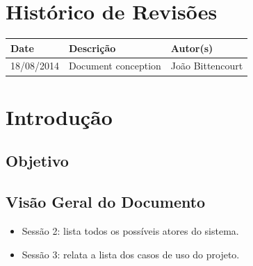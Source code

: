 \documentclass{article}
\begin{document}

\capa
\newpage

\section*{\center Histórico de Revisões}
  \vspace*{1cm}
  \begin{table}[ht]
    \centering
    \begin{tabular}[pos]{|m{2cm} | m{7.2cm} | m{3.8cm}|} 
      \hline
      \cellcolor[gray]{0.9}
      \textbf{Date} & \cellcolor[gray]{0.9}\textbf{Descrição} & \cellcolor[gray]{0.9}\textbf{Autor(s)}\\ \hline
      \hline
      \small 18/08/2014 & \small Document conception & \small João Bittencourt \\ \hline      
    \end{tabular}
  \end{table}

\newpage

\tableofcontents
\newpage

\section{Introdução}

  \subsection{Objetivo}
  
  \subsection{Visão Geral do Documento}
  \begin{itemize}
    \item Sessão 2: lista todos os possíveis atores do sistema.
    \item Sessão 3: relata a lista dos casos de uso do projeto.
  \end{itemize}
  
\end{document}
